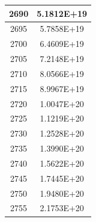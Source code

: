 \documentclass[a4paper]{article}
\begin{document}
\begin{tabular}{|c|c|}
		\hline
		2690 & 5.1812E+19 \\
		\hline
		2695 & 5.7858E+19 \\
		\hline
		2700 & 6.4609E+19 \\
		\hline
		2705 & 7.2148E+19 \\
		\hline
		2710 & 8.0566E+19 \\
		\hline
		2715 & 8.9967E+19 \\
		\hline
		2720 & 1.0047E+20 \\
		\hline
		2725 & 1.1219E+20 \\
		\hline
		2730 & 1.2528E+20 \\
		\hline
		2735 & 1.3990E+20 \\
		\hline
		2740 & 1.5622E+20 \\
		\hline
		2745 & 1.7445E+20 \\
		\hline
		2750 & 1.9480E+20 \\
		\hline
		2755 & 2.1753E+20 \\
		\hline
	\end{tabular}
	\hfill
\end{document}
